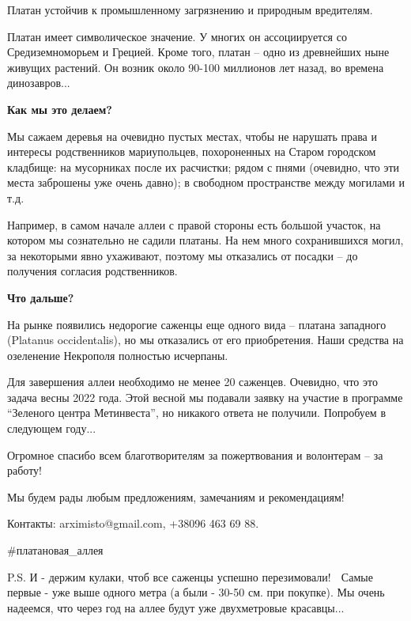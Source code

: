 Платан устойчив к промышленному загрязнению и природным вредителям.

Платан имеет символическое значение. У многих он ассоциируется со
Средиземноморьем и Грецией. Кроме того, платан – одно из древнейших ныне
живущих растений. Он возник около 90-100 миллионов лет назад, во времена
динозавров...

\textbf{Как мы это делаем?}

Мы сажаем деревья на очевидно пустых местах, чтобы не нарушать права и интересы
родственников мариупольцев, похороненных на Старом городском кладбище: на
мусорниках после их расчистки; рядом с пнями (очевидно, что эти места заброшены
уже очень давно); в свободном пространстве между могилами и т.д.

Например, в самом начале аллеи с правой стороны есть большой участок, на
котором мы сознательно не садили платаны. На нем много сохранившихся могил, за
некоторыми явно ухаживают, поэтому мы отказались от посадки – до получения
согласия родственников.

\textbf{Что дальше?}

На рынке появились недорогие саженцы еще одного вида – платана западного
(Platanus occidentalis), но мы отказались от его приобретения. Наши средства на
озеленение Некрополя полностью исчерпаны.

Для завершения аллеи необходимо не менее 20 саженцев. Очевидно, что это задача
весны 2022 года. Этой весной мы подавали заявку на участие в программе
\enquote{Зеленого центра Метинвеста}, но никакого ответа не получили. Попробуем
в следующем году...

Огромное спасибо всем благотворителям за пожертвования и волонтерам – за
работу!

Мы будем рады любым предложениям, замечаниям и рекомендациям!

Контакты: arximisto@gmail.com, +38096 463 69 88.

\#платановая\_аллея

P.S. И - держим кулаки, чтоб все саженцы успешно перезимовали! 🙂 Самые первые
- уже выше одного метра (а были - 30-50 см. при покупке). Мы очень надеемся,
что через год на аллее будут уже двухметровые красавцы...
